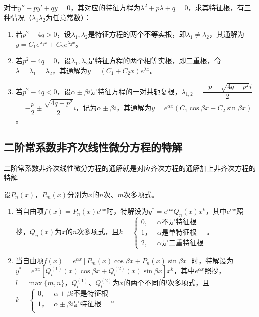 \documentclass[UTF8, 12pt]{ctexart}
\begin{document}
对于$y''+py'+qy=0$，其对应的特征方程为$\lambda^2+p\lambda+q=0$，求其特征根，有三种情况（$\lambda_1\lambda_2$为任意常数）：

\begin{enumerate}
    \item 若$p^2-4q>0$，设$\lambda_1,\lambda_2$是特征方程的两个不等实根，即$\lambda_1\neq\lambda_2$，其通解为$y=C_1e^{\lambda_1x}+C_2e^{\lambda_2x}$。
    \item 若$p^2-4q=0$，设$\lambda_1,\lambda_2$是特征方程的两个相等实根，即二重根，令$\lambda=\lambda_1=\lambda_2$，其通解为$y=(C_1+C_2x)e^{\lambda x}$。
    \item 若$p^2-4q<0$，设$\alpha\pm\beta i$是特征方程的一对共轭复根，$\lambda_{1,2}=\dfrac{-p\pm\sqrt{4q-p^2}i}{2}$\\$=-\dfrac{p}{2}\pm\dfrac{\sqrt{4q-p^2}}{2}i$，记为$\alpha\pm\beta i$，其通解为$y=e^{\alpha x}(C_1\cos\beta x+C_2\sin\beta x)$。
\end{enumerate}

\subsection{二阶常系数非齐次线性微分方程的特解}

二阶常系数非齐次线性微分方程的通解就是对应齐次方程的通解加上非齐次方程的特解

设$P_n(x)$，$P_m(x)$分别为$x$的$n$次、$m$次多项式。

\begin{enumerate}
    \item 当自由项$f(x)=P_n(x)e^{\alpha x}$时，特解设为$y^*=e^{\alpha x}Q_n(x)x^k$，其中$e^{\alpha x}$照抄，$Q_n(x)$为$x$的$n$次多项式，且$k=\left\{\begin{array}{ll}
        0, & \alpha\text{不是特征根} \\
        1， & \alpha\text{是单特征根} \\
        2, & \alpha\text{是二重特征根}
    \end{array}\right.$。
    \item 当自由项$f(x)=e^{\alpha x}[P_m(x)\cos\beta x+P_n(x)\sin\beta x]$时，特解设为$y^*=e^{\alpha x}[Q_l^{(1)}(x)\cos\beta x+Q_l^{(2)}(x)\sin\beta x]x^k$，其中$e^{\alpha x}$照抄，$l=\max\{m,n\}$，$Q_l^{(1)}$、$Q_l^{(2)}$为$x$的两个不同的$l$次多项式，且$k=\left\{\begin{array}{ll}
        0, & \alpha\pm\beta i\text{不是特征根} \\
        1， & \alpha\pm\beta i\text{是特征根} \\
    \end{array}\right.$。
\end{enumerate}
\end{document}
